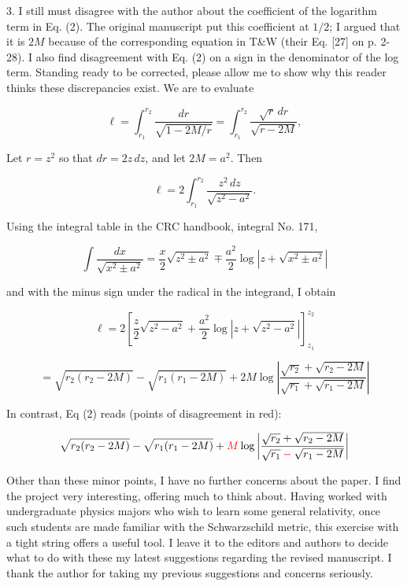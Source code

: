 \documentclass[12pt]{article}
\begin{document}
3. I still must disagree with the author about the coefficient of the
logarithm term in Eq. (2).  The original manuscript put this
coefficient at $1/2$; I argued that it is $2M$ because of the
corresponding equation in T\&W (their Eq. [27] on p. 2-28).  I also
find disagreement with Eq. (2) on a sign in the denominator of the log
term.  Standing ready to be corrected, please allow me to show why
this reader thinks these discrepancies exist.  We are to evaluate

\[
\ell=\int_{r_1}^{r_2}\frac{dr}{\sqrt{1-2M/r}} =
\int_{r_1}^{r_2}\frac{\sqrt{r}\,dr}{\sqrt{r-2M}},
\]

Let $r=z^2$ so that $dr=2z\,dz$, and let $2M=a^2$.  Then 

\[
\ell=2\int_{r_1}^{r_2} \frac{z^2\,dz}{\sqrt{z^2-a^2}}.
\]

 Using the integral table in the CRC handbook, integral No. 171,

\[
\int\frac{dx}{\sqrt{x^2\pm a^2}}=\frac{x}{2} \sqrt{z^2\pm a^2}
\mp \frac{a^2}{2}\log\left| z+\sqrt{x^2\pm a^2}\right|
\]


 and with the minus sign under the radical in the integrand, I obtain

\[
\ell = 2\left[
  \frac{z}{2}\sqrt{z^2-a^2} + \frac{a^2}{2}\log\left|z+\sqrt{z^2-a^2}\right|
  \right]_{z_1}^{z_2}
\]

\[
=
\sqrt{r_2(r_2-2M)}-\sqrt{r_1(r_1-2M)} + 2M\log\left|
\frac{\sqrt{r_2}+\sqrt{r_2-2M}}{\sqrt{r_1}+\sqrt{r_1-2M}}\right|
\]

In contrast, Eq (2) reads (points of disagreement in red):


\[
\sqrt{r_2(r_2-2M)}-\sqrt{r_1(r_1-2M)} 
+\color{red}M
\color{black}\log\left|
\frac{\sqrt{r_2}+\sqrt{r_2-2M}}{\sqrt{r_1}
  \color{red}-
  \color{black}\sqrt{r_1-2M}}\right|
\]


Other than these minor points, I have no further concerns about the
paper. I find the project very interesting, offering much to think
about. Having worked with undergraduate physics majors who wish to
learn some general relativity, once such students are made familiar
with the Schwarzschild metric, this exercise with a tight string
offers a useful tool. I leave it to the editors and authors to decide
what to do with these my latest suggestions regarding the revised
manuscript. I thank the author for taking my previous suggestions and
concerns seriously.
\end{document}
